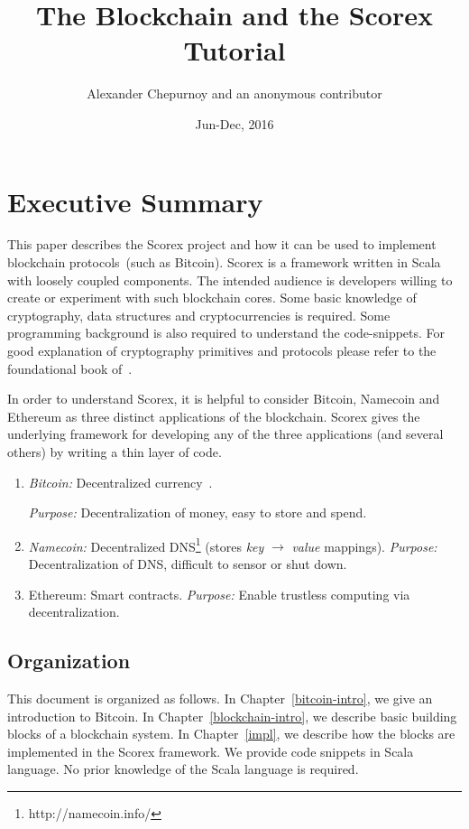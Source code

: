 \documentclass[]{report}   %
\begin{document}
\title{The Blockchain and the Scorex Tutorial}
\author{Alexander Chepurnoy and an anonymous contributor}         
\date{Jun-Dec, 2016}
\maketitle

\chapter{Executive Summary}

This paper describes the Scorex project and how it can be used to implement blockchain protocols~(such as Bitcoin). Scorex is a framework written in Scala with loosely coupled components. 
The intended audience is developers willing to create or experiment with such blockchain cores. Some basic knowledge of cryptography, data structures and cryptocurrencies is required. Some programming background is also required to understand the code-snippets. For good explanation of cryptography primitives and protocols please refer to the foundational book of~\cite{katz2014introduction}. 

In order to understand Scorex, it is helpful to consider Bitcoin, Namecoin and Ethereum as three distinct applications of the blockchain. Scorex gives the underlying framework for developing any of the three applications (and several others) by writing a thin layer of code. 

\begin{enumerate}
	\item {\em Bitcoin:} Decentralized currency~\cite{Nakamoto2008}.
	
		{\em Purpose:} Decentralization of money, easy to store and spend.		
	\item {\em Namecoin:} Decentralized DNS\footnote{http://namecoin.info/} (stores {\em key} $\rightarrow$ {\em value} mappings).
		{\em Purpose:} Decentralization of DNS, difficult to sensor or shut down.		
	\item {Ethereum:} Smart	contracts.	
	  {\em Purpose:} Enable trustless computing via decentralization.		
\end{enumerate}


\section{Organization}


This document is organized as follows. In Chapter~\ref{bitcoin-intro}, we give an introduction to Bitcoin. In Chapter~\ref{blockchain-intro}, we describe basic building blocks of a blockchain system. In Chapter~\ref{impl}, we describe how the blocks are implemented in the Scorex framework. We provide code snippets in Scala language. No prior knowledge of the Scala language is required.
\end{document}
